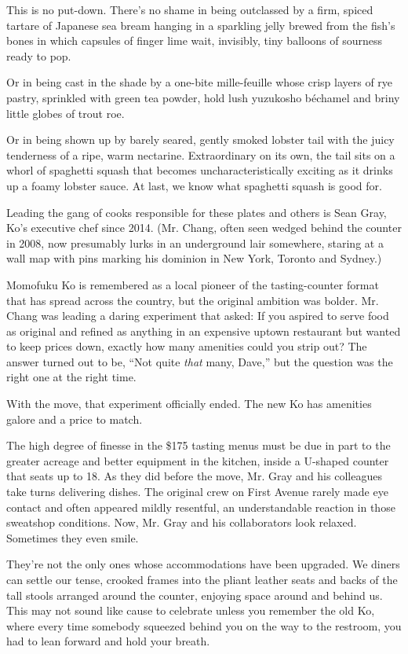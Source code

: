 This is no put-down. There's no shame in being outclassed by a firm,
spiced tartare of Japanese sea bream hanging in a sparkling jelly brewed
from the fish's bones in which capsules of finger lime wait, invisibly,
tiny balloons of sourness ready to pop.

Or in being cast in the shade by a one-bite mille-feuille whose crisp
layers of rye pastry, sprinkled with green tea powder, hold lush
yuzukosho béchamel and briny little globes of trout roe.

Or in being shown up by barely seared, gently smoked lobster tail with
the juicy tenderness of a ripe, warm nectarine. Extraordinary on its
own, the tail sits on a whorl of spaghetti squash that becomes
uncharacteristically exciting as it drinks up a foamy lobster sauce. At
last, we know what spaghetti squash is good for.

Leading the gang of cooks responsible for these plates and others is
Sean Gray, Ko's executive chef since 2014. (Mr. Chang, often seen wedged
behind the counter in 2008, now presumably lurks in an underground lair
somewhere, staring at a wall map with pins marking his dominion in New
York, Toronto and Sydney.)

Momofuku Ko is remembered as a local pioneer of the tasting-counter
format that has spread across the country, but the original ambition was
bolder. Mr. Chang was leading a daring experiment that asked: If you
aspired to serve food as original and refined as anything in an
expensive uptown restaurant but wanted to keep prices down, exactly how
many amenities could you strip out? The answer turned out to be, ``Not
quite \emph{that} many, Dave,'' but the question was the right one at
the right time.

With the move, that experiment officially ended. The new Ko has
amenities galore and a price to match.

The high degree of finesse in the \$175 tasting menus must be due in
part to the greater acreage and better equipment in the kitchen, inside
a U-shaped counter that seats up to 18. As they did before the move, Mr.
Gray and his colleagues take turns delivering dishes. The original crew
on First Avenue rarely made eye contact and often appeared mildly
resentful, an understandable reaction in those sweatshop conditions.
Now, Mr. Gray and his collaborators look relaxed. Sometimes they even
smile.

They're not the only ones whose accommodations have been upgraded. We
diners can settle our tense, crooked frames into the pliant leather
seats and backs of the tall stools arranged around the counter, enjoying
space around and behind us. This may not sound like cause to celebrate
unless you remember the old Ko, where every time somebody squeezed
behind you on the way to the restroom, you had to lean forward and hold
your breath.

